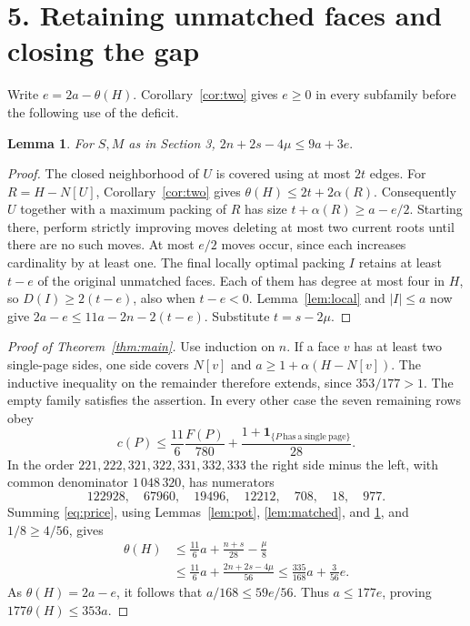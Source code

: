 \documentclass[11pt,a4paper]{article}
\newtheorem{lemma}[theorem]{Lemma}
\newcommand{\NN}{N}
\begin{document}
\newpage
\section*{5. Retaining unmatched faces and closing the gap}

Write \(e=2a-\theta(H)\). Corollary~\ref{cor:two} gives \(e\ge0\)
in every subfamily before the following use of the deficit.

\begin{lemma}\label{lem:retain}
For \(S,M\) as in Section 3,
\(\displaystyle 2n+2s-4\mu\le9a+3e.\)
\end{lemma}
\begin{proof}
The closed neighborhood of \(U\) is covered using at most \(2t\) edges.
For \(R=H-\NN[U]\), Corollary~\ref{cor:two} gives
\(\theta(H)\le2t+2\alpha(R)\). Consequently \(U\) together with a maximum
packing of \(R\) has size \(t+\alpha(R)\ge a-e/2\). Starting there,
perform strictly improving moves deleting at most two current roots until
there are no such moves. At most \(e/2\) moves occur, since each increases
cardinality by at least one. The final locally optimal packing \(I\) retains
at least \(t-e\) of the original unmatched faces. Each of them has degree
at most four in \(H\), so \(D(I)\ge 2(t-e)\), also when \(t-e<0\).
Lemma~\ref{lem:local} and \(|I|\le a\) now give
\(2a-e\le11a-2n-2(t-e)\). Substitute \(t=s-2\mu\).
\end{proof}

\begin{proof}[Proof of Theorem~\ref{thm:main}]
Use induction on \(n\). If a face \(v\) has at least two single-page sides,
one side covers \(\NN[v]\) and \(a\ge1+\alpha(H-\NN[v])\).
The inductive inequality on the remainder therefore extends, since
\(353/177>1\). The empty family satisfies the assertion. In every
other case the seven remaining rows obey
\begin{equation}\label{eq:price}
 c(P)\le\frac{11}{6}\frac{F(P)}{780}
           +\frac{1+\boldsymbol{1}_{\{P\ \mathrm{has\ a\ single\ page}\}}}{28}.
\end{equation}
In the order \(221,222,321,322,331,332,333\) the right side minus the
left, with common denominator \(1\,048\,320\), has numerators
\[
122928,\quad67960,\quad19496,\quad12212,\quad708,\quad18,\quad977.
\]
Summing \eqref{eq:price}, using Lemmas~\ref{lem:pot}, \ref{lem:matched},
and \ref{lem:retain}, and \(1/8\ge4/56\), gives
\begin{align*}
 \theta(H)
 &\le \frac{11}{6}a+\frac{n+s}{28}-\frac{\mu}{8}\\
 &\le \frac{11}{6}a+\frac{2n+2s-4\mu}{56}
 \le \frac{335}{168}a+\frac{3}{56}e .
\end{align*}
As \(\theta(H)=2a-e\), it follows that \(a/168\le59e/56\).
Thus \(a\le177e\), proving \(177\theta(H)\le353a\).
\end{proof}
\end{document}
